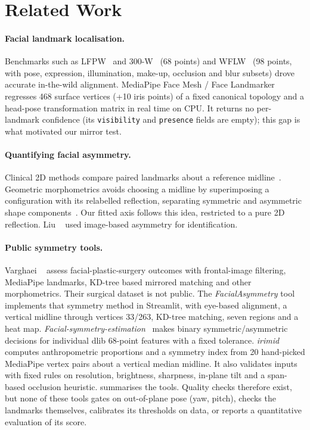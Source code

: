 \section{Related Work}
\label{sec:related}

\paragraph{Facial landmark localisation.}
Benchmarks such as LFPW~\cite{belhumeur2011lfpw} and 300-W~\cite{sagonas2013_300w,
sagonas2016_300w} (68 points) and WFLW~\cite{wu2018lab} (98 points, with pose, expression,
illumination, make-up, occlusion and blur subsets) drove accurate in-the-wild alignment.
MediaPipe Face Mesh / Face Landmarker~\cite{kartynnik2019facemesh,lugaresi2019mediapipe,
mediapipe_facelandmarker} regresses 468 surface vertices (+10 iris points) of a fixed
canonical topology and a head-pose transformation matrix in real time on CPU. It returns
no per-landmark confidence (its \texttt{visibility} and \texttt{presence} fields are empty);
this gap is what motivated our mirror test.

\paragraph{Quantifying facial asymmetry.}
Clinical 2D methods compare paired landmarks about a reference
midline~\cite{berlin2014asymmetry2d}. Geometric morphometrics avoids choosing a midline by
superimposing a configuration with its relabelled reflection, separating symmetric and
asymmetric shape components~\cite{klingenberg2002shape,mardia2000symmetry}. Our fitted axis
follows this idea, restricted to a pure 2D reflection. Liu \etal~\cite{liu2003asymmetry}
used image-based asymmetry for identification.

\paragraph{Public symmetry tools.}
Varghaei \etal~\cite{varghaei2025aesthetic} assess facial-plastic-surgery outcomes with
frontal-image filtering, MediaPipe landmarks, KD-tree based mirrored matching and other
morphometrics. Their surgical dataset is not public. The \textit{FacialAsymmetry}
tool~\cite{nashokan_facialasymmetry} implements that symmetry method in Streamlit, with
eye-based alignment, a vertical midline through vertices 33/263, KD-tree matching, seven
regions and a heat map. \textit{Facial-symmetry-estimation}~\cite{yousrajnahi_symmetry}
makes binary symmetric/asymmetric decisions for individual dlib 68-point features with a
fixed tolerance. \textit{irimid}~\cite{irimid} computes anthropometric proportions and a
symmetry index from 20 hand-picked MediaPipe vertex pairs about a vertical median midline.
It also validates inputs with fixed rules on resolution, brightness, sharpness, in-plane
tilt and a span-based occlusion heuristic.  summarises the tools.
Quality checks therefore exist, but none of these tools gates on out-of-plane pose (yaw,
pitch), checks the landmarks themselves, calibrates its thresholds on data, or reports a
quantitative evaluation of its score.


